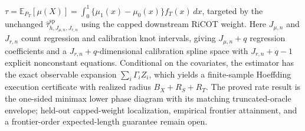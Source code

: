 \(\tau=\mathbb E_{P_T}[\mu(X)]=\int_0^1\{\mu_1(x)-\mu_0(x)\}f_T(x)\,dx\), targeted by the unchanged \(\widehat\tau^{\mathrm{sp}}_{h,J_{\mu,n},J_{r,n}}\) using the capped downstream RiCOT weight. Here \(J_{\mu,n}\) and \(J_{r,n}\) count regression and calibration knot intervals, giving \(J_{\mu,n}+q\) regression coefficients and a \(J_{r,n}+q\)-dimensional calibration spline space with \(J_{r,n}+q-1\) explicit nonconstant equations. Conditional on the covariates, the estimator has the exact observable expansion \(\sum_i\Gamma_i Z_i\), which yields a finite-sample Hoeffding execution certificate with realized radius \(B_X+R_S+R_T\). The proved rate result is the one-sided minimax lower phase diagram with its matching truncated-oracle envelope; held-out capped-weight localization, empirical frontier attainment, and a frontier-order expected-length guarantee remain open.